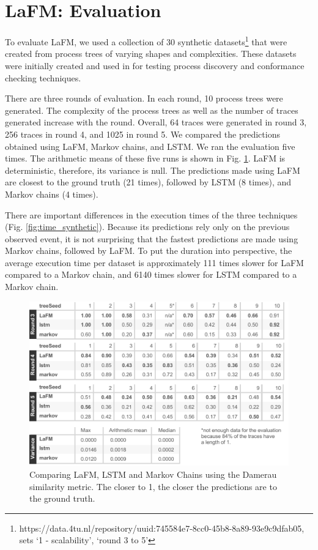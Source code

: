 \documentclass[runningheads]{llncs}
\begin{document}
\section{LaFM: Evaluation} \label{section:laFM_evaluation}
To evaluate LaFM, we used a collection of 30 synthetic datasets\footnote{https://data.4tu.nl/repository/uuid:745584e7-8cc0-45b8-8a89-93e9c9dfab05, sets `1 - scalability', `round 3 to 5'} that were created from process trees of varying shapes and complexities. These datasets were initially created and used in \cite{leemans2017robust} for testing process discovery and conformance checking techniques. 

There are three rounds of evaluation. In each round, 10 process trees were generated. The complexity of the process trees as well as the number of traces generated increase with the round. Overall, 64 traces were generated in round 3, 256 traces in round 4, and 1025 in round 5. We compared the predictions obtained using LaFM, Markov chains, and LSTM. We ran the evaluation five times. The arithmetic means of these five runs is shown in Fig. \ref{results_synthetic}. LaFM is deterministic, therefore, its variance is null. The predictions made using LaFM are closest to the ground truth (21 times), followed by LSTM (8 times), and Markov chains (4 times). 

There are important differences in the execution times of the three techniques (Fig. \ref{fig:time_synthetic}). Because its predictions rely only on the previous observed event, it is not surprising that the fastest predictions are made using Markov chains, followed by LaFM. To put the duration into perspective, the average execution time per dataset is approximately 111 times slower for LaFM compared to a Markov chain, and 6140 times slower for LSTM compared to a Markov chain.


\begin{figure}[H]
\begin{center}
\includegraphics[width=.95\columnwidth]{02-schema/results_synthetic.pdf}
\caption{Comparing LaFM, LSTM and Markov Chains using the Damerau similarity metric. The closer to 1, the closer the predictions are to the ground truth.}
\label{results_synthetic}
\end{center}
\vspace{-20pt}
\end{figure}
\end{document}
